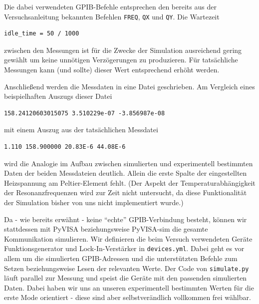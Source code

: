Die dabei verwendeten GPIB-Befehle entsprechen den bereits aus der Versuchsanleitung \cite{Anleitung} bekannten Befehlen \texttt{FREQ}, \texttt{QX} und \texttt{QY}.
Die Wartezeit
\begin{small}
\begin{lstlisting}[xleftmargin=10mm,numbers=none]
idle_time = 50 / 1000
\end{lstlisting}
\end{small}

zwischen den Messungen ist für die Zwecke der Simulation ausreichend gering gewählt um keine unnötigen Verzögerungen zu produzieren.
Für tatsächliche Messungen kann (und sollte) dieser Wert entsprechend erhöht werden.

Anschließend werden die Messdaten in eine Datei geschrieben. Am Vergleich eines beispielhaften Auszugs dieser Datei
\begin{small}
\begin{lstlisting}[xleftmargin=10mm,numbers=none]
158.24120603015075 3.510229e-07 -3.856987e-08
\end{lstlisting}
\end{small}

mit einem Auszug aus der tatsächlichen Messdatei
\begin{small}
\begin{lstlisting}[xleftmargin=10mm,numbers=none]
1.110 158.900000 20.83E-6 44.08E-6
\end{lstlisting}
\end{small}

wird die Analogie im Aufbau zwischen simulierten und experimentell bestimmten Daten der beiden Messdateien deutlich.
Allein die erste Spalte der eingestellten Heizspannung am Peltier-Element fehlt.
(Der Aspekt der Temperaturabhängigkeit der Resonanzfrequenzen wird zur Zeit nicht untersucht, da diese Funktionalität der Simulation bisher von uns nicht implementiert wurde.)

Da - wie bereits erwähnt - keine \enquote{echte} GPIB-Verbindung besteht, können wir stattdessen mit PyVISA beziehungsweise PyVISA-sim die gesamte Kommunikation simulieren.
Wir definieren die beim Versuch verwendeten Geräte Funktionsgenerator und Lock-In-Verstärker in \texttt{devices.yml}.
Dabei geht es vor allem um die simulierten GPIB-Adressen und die unterstützten Befehle zum Setzen beziehungsweise Lesen der relevanten Werte.
Der Code von \texttt{simulate.py} läuft parallel zur Messung und speist die Geräte mit den passenden simulierten Daten.
Dabei haben wir uns an unseren experimentell bestimmten Werten für die erste Mode orientiert - diese sind aber selbstverändlich vollkommen frei wählbar.

